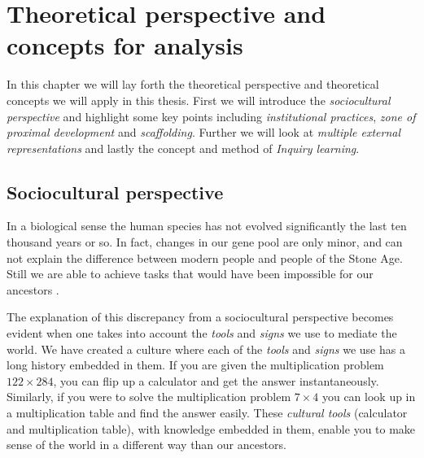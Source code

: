 \chapter{Theoretical perspective and concepts for analysis}

In this chapter we will lay forth the theoretical perspective and theoretical concepts we will apply in this thesis. First we will introduce the \emph{sociocultural perspective} and highlight some key points including \emph{institutional practices}, \emph{zone of proximal development} and \emph{scaffolding}. Further we will look at \emph{multiple external representations} and lastly the concept and method of \emph{Inquiry learning}.

\section{Sociocultural perspective}




In a biological sense the human species has not evolved significantly the last ten thousand years or so. In fact, changes in our gene pool are only minor, and can not explain the difference between modern people and people of the Stone Age. Still we are able to achieve tasks that would have been impossible for our ancestors \citep{saljo2001laering}.

The explanation of this discrepancy from a sociocultural perspective becomes evident when one takes into account the \emph{tools} and \emph{signs} we use to mediate the world. We have created a culture where each of the \emph{tools} and \emph{signs} we use has a long history embedded in them. If you are given the multiplication problem \ensuremath{122\times284}, you can flip up a calculator and get the answer instantaneously. Similarly, if you were to solve the multiplication problem \ensuremath{7\times4} you can look up in a multiplication table and find the answer easily. These \emph{cultural tools} (calculator and multiplication table), with knowledge embedded in them, enable you to make sense of the world in a different way than our ancestors. 

